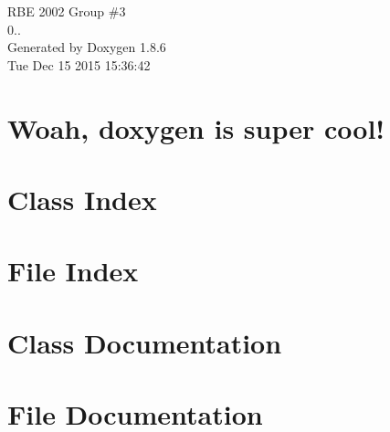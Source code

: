 \documentclass[twoside]{book}
\newcommand{\clearemptydoublepage}{%
  \newpage{\pagestyle{empty}\cleardoublepage}%
}
\begin{document}
\hypersetup{pageanchor=false}
\begin{titlepage}
\vspace*{7cm}
\begin{center}%
{\Large R\-B\-E 2002 Group \#3 \\[1ex]\large 0.. }\\
\vspace*{1cm}
{\large Generated by Doxygen 1.8.6}\\
\vspace*{0.5cm}
{\small Tue Dec 15 2015 15:36:42}\\
\end{center}
\end{titlepage}
\clearemptydoublepage
\tableofcontents
\clearemptydoublepage
{}
\hypersetup{pageanchor=true}

\chapter{Woah, doxygen is super cool!}
\label{index}\hypertarget{index}{}
\chapter{Class Index}

\chapter{File Index}

\chapter{Class Documentation}



















\chapter{File Documentation}




































\newpage
{}
{}
\printindex
\end{document}
